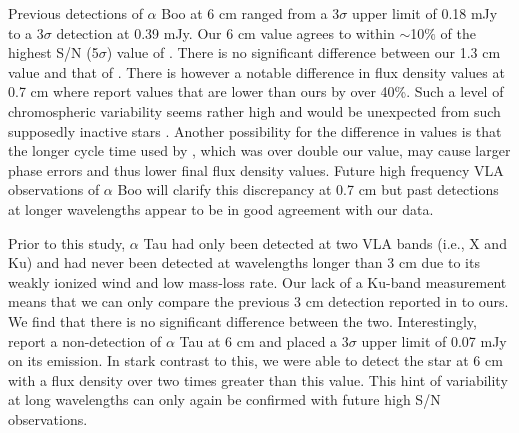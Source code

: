 \documentclass[iop]{emulateapj}
\begin{document}
Previous detections of $\alpha$ Boo at 6 cm ranged from a 3$\sigma$ upper limit of 0.18 mJy to a 3$\sigma$ detection at 0.39 mJy. Our 6 cm value agrees to within $\sim$10$\%$ of the highest S/N (5$\sigma$) value of \cite{1986AJ.....91..602D}. There is no significant difference between our 1.3 cm value and that of \cite{2011AA...533A.107D}. There is however a notable difference in flux density values at 0.7 cm  where \cite{2011AA...533A.107D} report values that are lower than ours by over 40\%. Such a level of chromospheric variability seems rather high and would be unexpected from such supposedly inactive stars \citep{2013MNRAS.428.2064H}. Another possibility for the difference in values is that the longer cycle time used by \cite{2011AA...533A.107D}, which was over double our value, may cause larger phase errors and thus lower final flux density values. Future high frequency VLA observations of $\alpha$ Boo will clarify this discrepancy at 0.7 cm but past detections at longer wavelengths appear to be in good agreement with our data.

Prior to this study, $\alpha$ Tau had only been detected at two VLA bands (i.e., X and Ku) and had never been detected at wavelengths longer than 3 cm due to its weakly ionized wind and low mass-loss rate. Our lack of a Ku-band measurement means that we can only compare the previous 3 cm detection reported in \cite{2007ApJ...655..946W} to ours. We find that there is no significant difference between the two. Interestingly, \cite{2007ApJ...655..946W} report a non-detection of $\alpha$ Tau at 6 cm and placed a 3$\sigma$ upper limit of 0.07 mJy on its emission. In stark contrast to this, we were able to detect the star at 6 cm with a flux density over two times greater than this value. This hint of variability at long wavelengths can only again be confirmed with future high S/N observations.
\end{document}
